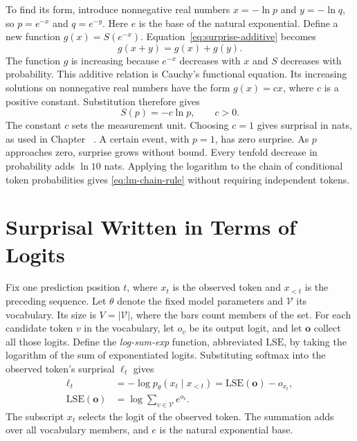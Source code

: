 \documentclass[12pt]{report}
\newcommand{\chref}[1]{Chapter~\uppercase\expandafter{\romannumeral\getrefnumber{#1}}}
\begin{document}
To find its form, introduce nonnegative real numbers $x=-\ln p$ and
$y=-\ln q$, so $p=e^{-x}$ and $q=e^{-y}$. Here $e$ is the base of the
natural exponential. Define a new function $g(x)=S(e^{-x})$.
Equation~\eqref{eq:surprise-additive} becomes
\[
g(x+y)=g(x)+g(y).
\]
The function $g$ is increasing because $e^{-x}$ decreases with $x$
and $S$ decreases with probability. This additive relation is Cauchy's
functional equation. Its increasing solutions on nonnegative real
numbers have the form $g(x)=cx$, where $c$ is a positive constant.
Substitution therefore gives
\begin{equation}
S(p)=-c\ln p,\qquad c>0.
\label{eq:surprise-log}
\end{equation}
The constant $c$ sets the measurement unit. Choosing $c=1$ gives
surprisal in nats, as used in \chref{ch:lm} \cite{shannon1948}.
A certain event, with $p=1$, has zero surprise. As $p$ approaches zero,
surprise grows without bound. Every tenfold decrease in probability
adds $\ln 10$ nats. Applying the logarithm to the chain of conditional
token probabilities gives \eqref{eq:lm-chain-rule} without requiring
independent tokens.

\section{Surprisal Written in Terms of Logits}
Fix one prediction position $t$, where $x_t$ is the observed token
and $x_{<t}$ is the preceding sequence. Let $\theta$ denote the fixed
model parameters and $\mathcal V$ its vocabulary. Its size is
$V=|\mathcal V|$, where the bars count members of the set. For each
candidate token $v$ in the vocabulary, let $o_v$ be its output logit,
and let $\mathbf o$ collect all those logits. Define the
\emph{log-sum-exp} function, abbreviated $\mathrm{LSE}$, by taking
the logarithm of the sum of exponentiated logits. Substituting
softmax into the observed token's surprisal $\ell_t$ gives
\begin{equation}
\begin{split}
\ell_t
 &=-\log p_\theta(x_t\mid x_{<t})
   =\mathrm{LSE}(\mathbf o)-o_{x_t},\\
\mathrm{LSE}(\mathbf o)
 &=\log\sum_{v\in\mathcal V}e^{o_v}.
\end{split}
\label{eq:lse-surprisal}
\end{equation}
The subscript $x_t$ selects the logit of the observed token.
The summation adds over all vocabulary members, and $e$ is the
natural exponential base.
\end{document}
